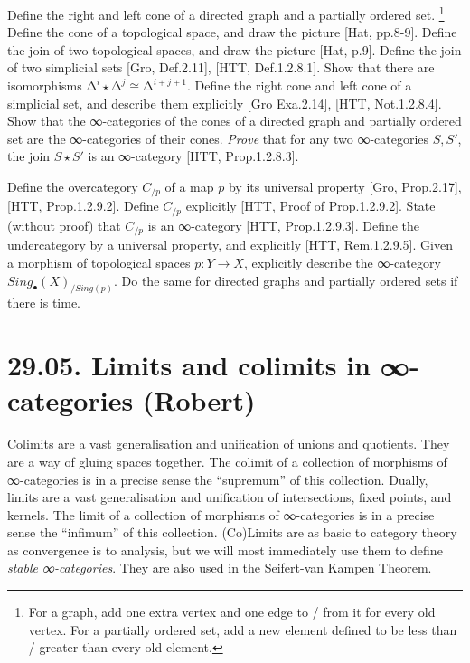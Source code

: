 \documentclass[a4paper]{amsart}
\numberwithin{figure}{section}
\theoremstyle{theorem}
\theoremstyle{definition}
\begin{document}
Define the right and left cone of a directed graph and a partially ordered set.%
\footnote{For a graph, add one extra vertex and one edge to / from it for every old vertex. For a partially ordered set, add a new element defined to be less than / greater than every old element.} %
Define the cone of a topological space, and draw the picture [Hat, pp.8-9]. %
Define the join of two topological spaces, and draw the picture [Hat, p.9]. %
Define the join of two simplicial sets [Gro, Def.2.11], [HTT, Def.1.2.8.1]. %
Show that there are isomorphisms $∆^{i} {\star} ∆^{j} \cong ∆^{i+j+1}$. %
Define the right cone and left cone of a simplicial set, and describe them explicitly [Gro Exa.2.14], [HTT, Not.1.2.8.4]. %
Show that the ∞-categories of the cones of a directed graph and partially ordered set are the ∞-categories of their cones. %
\emph{Prove} that for any two ∞-categories $S, S'$, the join $S \star S'$ is an ∞-category [HTT, Prop.1.2.8.3]. %

Define the overcategory  $C_{/p}$ of a map $p$ by its universal property [Gro, Prop.2.17], [HTT, Prop.1.2.9.2]. %
Define $C_{/p}$  explicitly [HTT, Proof of Prop.1.2.9.2]. %
State (without proof) that $C_{/p}$ is an ∞-category [HTT, Prop.1.2.9.3]. %
Define the undercategory by a universal property, and explicitly [HTT, Rem.1.2.9.5]. %
Given a morphism of topological spaces $p: Y \to X$, explicitly describe the ∞-category $Sing_\bullet(X)_{/Sing(p)}$. %
Do the same for directed graphs and partially ordered sets if there is time.



\section{29.05. Limits and colimits in ∞-categories (Robert)}

Colimits are a vast generalisation and unification of unions and quotients. They are a way of gluing spaces together. The colimit of a collection of morphisms of ∞-categories is in a precise sense the ``supremum'' of this collection. %
Dually, limits are a vast generalisation and unification of intersections, fixed points, and kernels. The limit of a collection of morphisms of ∞-categories is in a precise sense the ``infimum'' of this collection. %
(Co)Limits are as basic to category theory as convergence is to analysis, but we will most immediately use them to define \emph{stable ∞-categories}. %
They are also used in the Seifert-van Kampen Theorem.
\end{document}
